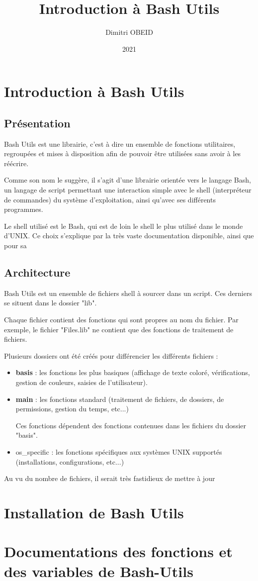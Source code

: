 \documentclass[a4paper,10pt]{article}
\title{Introduction à Bash Utils}
\author{Dimitri OBEID}
\date{2021}
\begin{document}
\maketitle
\newpage

\tableofcontents
\section{Introduction à Bash Utils}
\subsection{Présentation}
Bash Utils est une librairie, c'est à dire un ensemble de fonctions utilitaires, regroupées et mises à disposition afin de pouvoir être utilisées sans avoir à les réécrire.

Comme son nom le suggère, il s'agit d'une librairie orientée vers le langage Bash, un langage de script permettant une interaction simple avec le shell (interpréteur de commandes) du système d'exploitation, ainsi qu'avec ses différents programmes.

Le shell utilisé est le Bash, qui est de loin le shell le plus utilisé dans le monde d'UNIX. Ce choix s'explique par la très vaste documentation disponible, ainsi que pour sa

\subsection{Architecture}
Bash Utils est un ensemble de fichiers shell à sourcer dans un script. Ces derniers se situent dans le dossier "lib".

Chaque fichier contient des fonctions qui sont propres au nom du fichier. Par exemple, le fichier "Files.lib" ne contient que des fonctions de traitement de fichiers.

Plusieurs dossiers ont été créés pour différencier les différents fichiers :
\begin{itemize}
    \item \textbf{basis} : les fonctions les plus basiques (affichage de texte coloré, vérifications, gestion de couleurs, saisies de l'utilisateur).\\
    
    \item \textbf{main} : les fonctions standard (traitement de fichiers, de dossiers, de permissions, gestion du temps, etc...)
    
    Ces fonctions dépendent des fonctions contenues dans les fichiers du dossier "basis".\\

    \item os\_specific : les fonctions spécifiques aux systèmes UNIX supportés (installations, configurations, etc...)
\end{itemize}


Au vu du nombre de fichiers, il serait très fastidieux de mettre à jour 


\section{Installation de Bash Utils}
\section{Documentations des fonctions et des variables de Bash-Utils}
\end{document}
